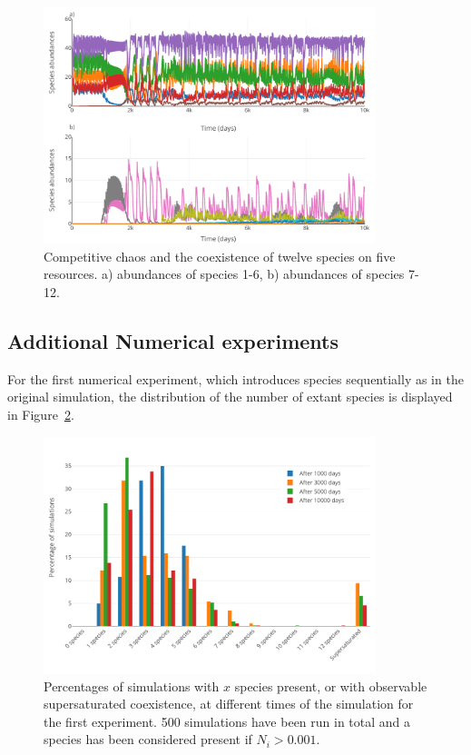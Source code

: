 \begin{figure}[H]
	\begin{center} 
		\includegraphics[width=0.86\textwidth]{../Code/Figures/Figure_4.pdf}
 		\caption{Competitive chaos and the coexistence of twelve species on five resources. a) abundances of species 1-6, b) abundances of species 7-12. }
 		\label{figures:Fig4}
	\end{center}
\end{figure}

\subsection{Additional Numerical experiments}

For the first numerical experiment, which introduces species sequentially as in the original simulation, the distribution of the number of extant species is displayed in Figure~\ref{figures:Figexp1bar}.

\begin{figure}[H]
	\begin{center} 
		\includegraphics[width=0.86\textwidth]{../Code/Figures/Figure_exp1_bar.pdf}
 		\caption{Percentages of simulations with $x$ species present, or with observable supersaturated coexistence, at different times of the simulation for the first experiment. 500 simulations have been run in total and a species has been considered present if $N_i > 0.001$.}
 		\label{figures:Figexp1bar}
	\end{center}
\end{figure}

